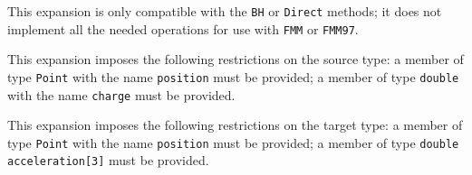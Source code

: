 This expansion is only compatible with the \texttt{BH} or \texttt{Direct}
methods; it does not implement all the needed operations for use with
\texttt{FMM} or \texttt{FMM97}.

This expansion imposes the following restrictions on the source type: a
member of type \texttt{Point} with the name \texttt{position} must be provided;
a member of  type \texttt{double} with the name \texttt{charge} must be
provided.

This expansion imposes the following restrictions on the target type: a
member of type \texttt{Point} with the name \texttt{position} must be provided;
a member of type \texttt{double acceleration[3]} must
be provided.
